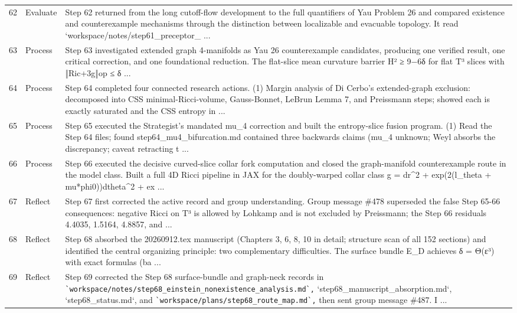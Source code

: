 \documentclass[UTF8,fontset=fandol,zihao=-4]{ctexart}
\begin{document}
\begin{longtable}{r p{} >{\raggedright\arraybackslash}p{}}
62 & Evaluate & Step 62 returned from the long cutoff-flow development to the full quantifiers of Yau Problem 26 and compared existence and counterexample mechanisms through the distinction between localizable and evacuable topology. It read `workspace/notes/step61\_preceptor\_ ...\\
63 & Process & Step 63 investigated extended graph 4-manifolds as Yau 26 counterexample candidates, producing one verified result, one critical correction, and one foundational reduction. The flat-slice mean curvature barrier H² ≥ 9−6δ for flat T³ slices with ‖Ric+3g‖op ≤ δ  ...\\
64 & Process & Step 64 completed four connected research actions. (1) Margin analysis of Di Cerbo's extended-graph exclusion: decomposed into CSS minimal-Ricci-volume, Gauss-Bonnet, LeBrun Lemma 7, and Preissmann steps; showed each is exactly saturated and the CSS entropy in ...\\
65 & Process & Step 65 executed the Strategist's mandated mu\_4 correction and built the entropy-slice fusion program. (1) Read the Step 64 files; found step64\_mu4\_bifurcation.md contained three backwards claims (mu\_4 unknown; Weyl absorbs the discrepancy; caveat retracting t ...\\
66 & Process & Step 66 executed the decisive curved-slice collar fork computation and closed the graph-manifold counterexample route in the model class. Built a full 4D Ricci pipeline in JAX for the doubly-warped collar class g = dr\textasciicircum{}2 + exp(2(l\_theta + mu*phi0))dtheta\textasciicircum{}2 + ex ...\\
67 & Reflect & Step 67 first corrected the active record and group understanding. Group message \#478 superseded the false Step 65-66 consequences: negative Ricci on T³ is allowed by Lohkamp and is not excluded by Preissmann; the Step 66 residuals 4.4035, 1.5164, 4.8857, and  ...\\
68 & Reflect & Step 68 absorbed the 20260912.tex manuscript (Chapters 3, 6, 8, 10 in detail; structure scan of all 152 sections) and identified the central organizing principle: two complementary difficulties. The surface bundle E\_D achieves δ = Θ(ε³) with exact formulas (ba ...\\
69 & Reflect & Step 69 corrected the Step 68 surface-bundle and graph-neck records in \nolinkurl{`workspace/notes/step68_einstein_nonexistence_analysis.md`,} `step68\_manuscript\_absorption.md`, `step68\_status.md`, and \nolinkurl{`workspace/plans/step68_route_map.md`,} then sent group message \#487. I ...\\

\end{longtable}
\end{document}
